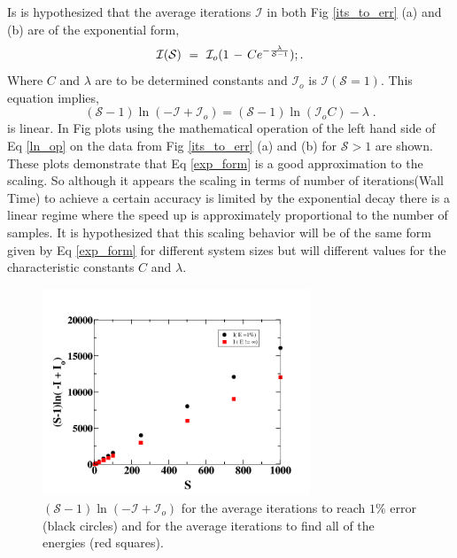\documentclass[twocolumn]{article}
\begin{document}
Is is hypothesized that the average iterations $\mathcal{I}$ in both Fig \ref{its_to_err} (a) and (b) are of the exponential form, 
\begin{equation}
\mathcal{I} (\mathcal{S}) \hspace{0.125cm} = \hspace{0.125cm}
 \mathcal{I}_o ( 1 \hspace{0.05cm} - \hspace{0.05cm} Ce^{-  \frac{\lambda}{\mathcal{S}-1}   } ) ;.
 \label{exp_form}
\end{equation}
 Where $C$ and $\lambda$ are to be determined constants and $\mathcal{I}_o$ is $\mathcal{I}(\mathcal{S}=1)$. This equation implies, 
 \begin{equation}
 (\mathcal{S}-1)\ln(-\mathcal{I}+ \mathcal{I}_{o}) = (\mathcal{S}-1)\ln(\mathcal{I}_o C) - \lambda \;.
 \label{ln_op}
 \end{equation}
 is linear. In Fig  plots using the mathematical operation of the left hand side of Eq \ref{ln_op} on the data from Fig \ref{its_to_err} (a) and (b) for $\mathcal{S}>1$ are shown. These plots demonstrate that Eq \ref{exp_form} is a good approximation to the scaling. So although it appears the scaling in terms of number of iterations(Wall Time) to achieve a certain accuracy is limited by the exponential decay there is a linear regime where the speed up is approximately proportional to the number of samples. It is hypothesized that this scaling behavior will be of the same form given by Eq \ref{exp_form} for different system sizes but will different values for the characteristic constants $C$ and $\lambda$. 
\begin{figure}[h!]
\includegraphics[width=8cm]{Tfrm_both.png}
\caption{ $(\mathcal{S}-1 )\ln(-\mathcal{I} + \mathcal{I}_o ) $ for the average iterations to reach  $1\%$ error (black circles) and for the average iterations to find all of the energies (red squares). \label{log_val} }
\end{figure}
\end{document}
